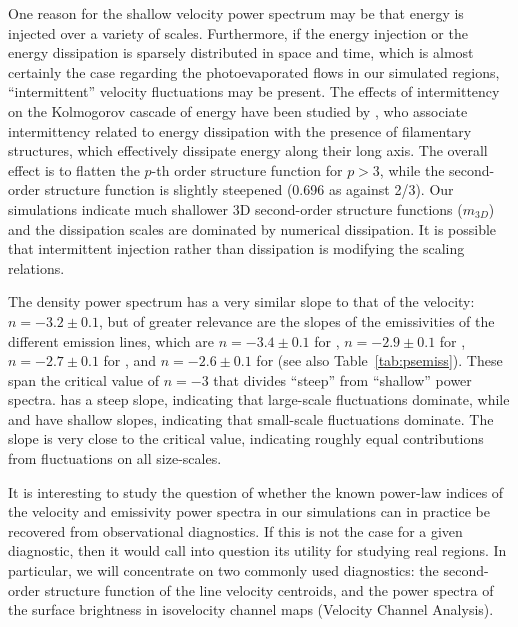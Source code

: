 \documentclass[useAMS,usenatbib]{mn2e}
\begin{document}
One reason for the shallow velocity power spectrum may be that energy
is injected over a variety of scales.  Furthermore, if the energy
injection or the energy dissipation is sparsely distributed in space
and time, which is almost certainly the case regarding the
photoevaporated flows in our simulated \hii{} regions,
``intermittent'' velocity fluctuations may be present. The effects of
intermittency on the Kolmogorov cascade of energy have been studied by
\citet{1994PhRvL..72..336S}, who associate intermittency related to
energy dissipation with the presence of filamentary structures, which
effectively dissipate energy along their long axis. The overall effect
is to flatten the $p$-th order structure function for $p >3$, while
the second-order structure function is slightly steepened (0.696 as
against 2/3). Our simulations indicate much shallower 3D second-order
structure functions ($m_{3D}$) and the dissipation scales are
dominated by numerical dissipation. It is possible that intermittent
injection rather than dissipation is modifying the scaling relations.


The density power spectrum has a very similar slope to that of the velocity: \(n = -3.2 \pm 0.1\),
but of greater relevance
are the slopes of the emissivities of the different emission lines,
which are \(n = -3.4 \pm 0.1\) for \oiii{}, 
\(n = -2.9 \pm 0.1\) for \ha,
\(n = -2.7 \pm 0.1\) for \nii, and
\(n = -2.6 \pm 0.1\) for \sii (see also Table~\ref{tab:psemiss}).
These span the critical value of \(n = -3\)
that divides ``steep'' from ``shallow'' power spectra.
\oiii{} has a steep slope,
indicating that large-scale fluctuations dominate,
while \nii{} and \sii{} have shallow slopes,
indicating that small-scale fluctuations dominate. 
The \ha{} slope is very close to the critical value,
indicating roughly equal contributions from fluctuations on all size-scales.

It is interesting to study the question of whether
the known power-law indices of the velocity and emissivity power spectra in our simulations
can in practice be recovered from observational diagnostics.  
If this is not the case for a given diagnostic,
then it would call into question its utility for studying real \hii{} regions.
In particular, we will concentrate on two commonly used diagnostics:
the second-order structure function of the line velocity centroids,
and the power spectra of the surface brightness in isovelocity channel maps
(Velocity Channel Analysis). 
\end{document}
